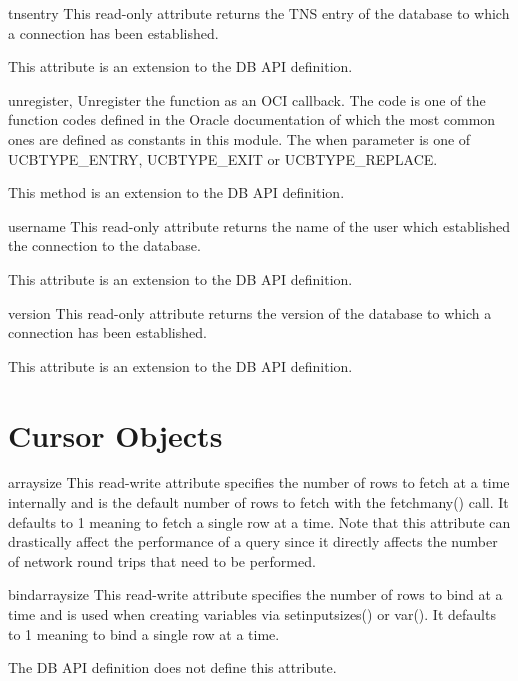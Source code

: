 \documentclass{manual}
\begin{document}
\begin{datadesc}{tnsentry}
  This read-only attribute returns the TNS entry of the database to which a
  connection has been established.

   This attribute is an extension to the DB API definition.
\end{datadesc}

\begin{funcdesc}{unregister}{, }
  Unregister the function as an OCI callback. The code is one of the function
  codes defined in the Oracle documentation of which the most common ones are
  defined as constants in this module. The when parameter is one of
  UCBTYPE_ENTRY, UCBTYPE_EXIT or UCBTYPE_REPLACE.

   This method is an extension to the DB API definition.
\end{funcdesc}

\begin{datadesc}{username}
  This read-only attribute returns the name of the user which established the
  connection to the database.

   This attribute is an extension to the DB API definition.
\end{datadesc}

\begin{datadesc}{version}
  This read-only attribute returns the version of the database to which a
  connection has been established.

   This attribute is an extension to the DB API definition.
\end{datadesc}

\chapter{Cursor Objects\label{cursorobj}}

\begin{datadesc}{arraysize}
  This read-write attribute specifies the number of rows to fetch at a time
  internally and is the default number of rows to fetch with the fetchmany()
  call. It defaults to 1 meaning to fetch a single row at a time. Note that
  this attribute can drastically affect the performance of a query since it
  directly affects the number of network round trips that need to be performed.
\end{datadesc}

\begin{datadesc}{bindarraysize}
  This read-write attribute specifies the number of rows to bind at a time and
  is used when creating variables via setinputsizes() or var(). It defaults to
  1 meaning to bind a single row at a time.

   The DB API definition does not define this attribute.
\end{datadesc}
\end{document}
